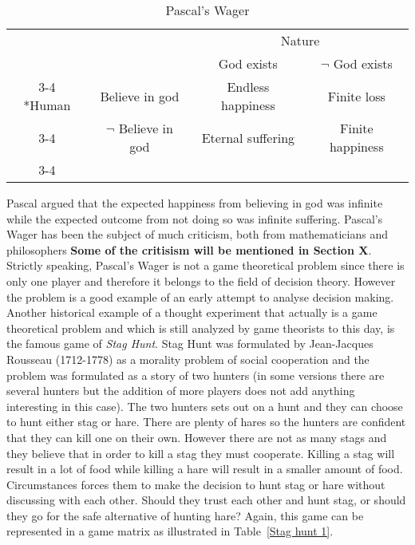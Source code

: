 \documentclass{article}
\theoremstyle{definition}
\theoremstyle{remark}
\begin{document}
\begin{table}[h!]
  \centering
  \setlength{\extrarowheight}{2pt}
  \begin{tabular}{cc|c|c|}
    & \multicolumn{1}{c}{} & \multicolumn{2}{c}{Nature}\\
    & \multicolumn{1}{c}{} & \multicolumn{1}{c}{God exists}  &
                                                              \multicolumn{1}{c}{$\neg$
                                                               God exists}
    \\\cline{3-4}
\multirow{2}*{Human}  & Believe in god & Endless happiness & Finite loss \\\cline{3-4}
    & $\neg$ Believe in god & Eternal suffering & Finite happiness \\\cline{3-4}
  \end{tabular}
  \caption{Pascal's Wager}
  \label{Pascal}
\end{table}

Pascal argued that the expected happiness from believing in god was
infinite while the expected outcome from not doing so was infinite
suffering. Pascal's Wager has been the subject of much criticism, both
from mathematicians and philosophers \textbf{Some of the critisism
  will be mentioned in Section X}. Strictly speaking, Pascal's Wager is not a
game theoretical problem since there is only one player and therefore it
belongs to the field of decision theory. However the problem is a good
example of an early attempt to analyse decision making. Another
historical example of a thought experiment that actually is a game
theoretical problem and which is still analyzed by game theorists to
this day, is the famous game of \emph{Stag Hunt}. Stag Hunt was
formulated by Jean-Jacques Rousseau (1712-1778) as a morality problem
of social cooperation and the problem was formulated as a story of two
hunters (in some versions there are several hunters but the addition
of more players does not add anything interesting in this case). The
two hunters sets out on a hunt and they can choose to hunt either stag
or hare. There are plenty of hares so the hunters are confident that
they can kill one on their own. However there are not as many stags
and they believe that in order to kill a stag they must
cooperate. Killing a stag will result in a lot of food while killing
a hare will result in a smaller amount of food. Circumstances forces
them to make the decision to hunt stag or hare without discussing with
each other. Should they trust each other and hunt stag, or should they
go for the safe alternative of hunting hare? Again, this game can be
represented in a game matrix as illustrated in Table~\ref{Stag hunt 1}.\\ 
\end{document}
